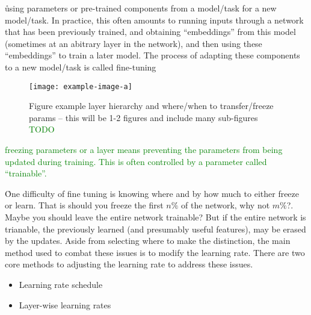 
\r{using parameters or pre-trained components from a model/task for a new model/task.  In practice, this often amounts to running inputs through a network that has been previously trained, and obtaining ``embeddings'' from this model (sometimes at an abitrary layer in the network), and then using these ``embeddings'' to train a later model. The process of adapting these components to a new model/task is called fine-tuning}


\begin{figure}[htp]
	\centering
	\texttt{[image: example-image-a]}\hfil
	\caption{Figure example layer hierarchy and where/when to transfer/freeze params -- this will be 1-2 figures and include many sub-figures \textcolor{green}{TODO}}
	\label{fig:transfer_learning_subfigs_a}
\end{figure}

\textcolor{green}{{freezing} parameters or a layer means preventing the parameters from being updated during training. This is often controlled by a parameter called ``trainable''.}



\r{One difficulty of fine tuning is knowing where and by how much to either freeze or learn. That is should you freeze the first $n\%$ of the network, why not $m\%$?. Maybe you should leave the entire network trainable? But if the entire network is trianable, the previously learned (and presumably useful features), may be erased by the updates. Aside from selecting where to make the distinction, the main method used to combat these issues is to modify the learning rate. There are two core methods to adjusting the learning rate to address these issues.}

\begin{itemize}[noitemsep,topsep=0pt]
	\item Learning rate schedule
	\item Layer-wise learning rates
\end{itemize}


